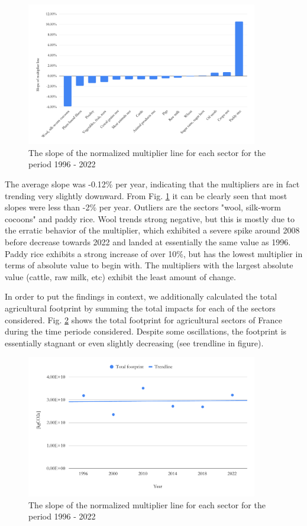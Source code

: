 \documentclass[a4paper,twoside]{article}
\begin{document}
\begin{figure}[H]
\centering
\includegraphics[width=0.9\textwidth]{slope}
\caption{The slope of the normalized multiplier line for each sector for the period 1996 - 2022}\label{fig:slope} 
\end{figure}

The average slope was -0.12\% per year, indicating that the multipliers are in fact trending very slightly downward. From Fig. \ref{fig:slope} it can be clearly seen that most slopes were less than -2\% per year. Outliers are the sectors "wool, silk-worm cocoons" and paddy rice. Wool trends strong negative, but this is mostly due to the erratic behavior of the multiplier, which exhibited a severe spike around 2008 before decrease towards 2022 and landed at essentially the same value as 1996. Paddy rice exhibits a strong increase of over 10\%, but has the lowest multiplier in terms of absolute value to begin with. The multipliers with the largest absolute value (cattle, raw milk, etc) exhibit the least amount of change.

In order to put the findings in context, we additionally calculated the total agricultural footprint by summing the total impacts for each of the sectors considered. Fig. \ref{fig:totalfootprint} shows the total footprint for agricultural sectors of France during the time periode considered. Despite some oscillations, the footprint is essentially stagnant or even slightly decreasing (see trendline in figure).

\begin{figure}[H]
\centering
\includegraphics[width=0.9\textwidth]{totalfootprint}
\caption{The slope of the normalized multiplier line for each sector for the period 1996 - 2022}\label{fig:totalfootprint} 
\end{figure}
\end{document}
